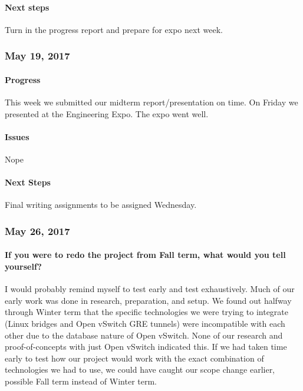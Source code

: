 \documentclass[10pt,onecolumn,journal,draftclsnofoot]{IEEEtran}
\begin{document}
\paragraph{Next steps} 

Turn in the progress report and prepare for expo next week.

\subsubsection{May 19, 2017} 

\paragraph{Progress} 

This week we submitted our midterm report/presentation on time. On
Friday we presented at the Engineering Expo. The expo went well.

\paragraph{Issues} 

Nope

\paragraph{Next Steps} 

Final writing assignments to be assigned Wednesday.

\subsubsection{May 26, 2017} 

\paragraph{If you were to redo the project from Fall term, what would
you tell
yourself?} 

I would probably remind myself to test early and test exhaustively. Much
of our early work was done in research, preparation, and setup. We found
out halfway through Winter term that the specific technologies we were
trying to integrate (Linux bridges and Open vSwitch GRE tunnels) were
incompatible with each other due to the database nature of Open vSwitch.
None of our research and proof-of-concepts with just Open vSwitch
indicated this. If we had taken time early to test how our project would
work with the exact combination of technologies we had to use, we could
have caught our scope change earlier, possible Fall term instead of
Winter term.
\end{document}
